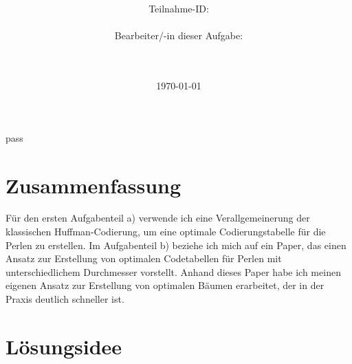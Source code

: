 pass\documentclass[a4paper,10pt,ngerman]{scrartcl}
\title{\textbf{\Huge\Aufgabe}}
\author{\LARGE Teilnahme-ID: \LARGE \TeilnahmeId \\\\
\LARGE Bearbeiter/-in dieser Aufgabe: \\
\LARGE \Name\\\\}
\date{\LARGE\today}
\begin{document}
    \maketitle
    \tableofcontents

    \section*{Zusammenfassung}
    Für den ersten Aufgabenteil a) verwende ich eine Verallgemeinerung der klassischen Huffman-Codierung, um eine optimale Codierungstabelle für die Perlen zu erstellen.
    Im Aufgabenteil b) beziehe ich mich auf ein Paper, das einen Ansatz zur Erstellung von optimalen Codetabellen für Perlen mit unterschiedlichem Durchmesser vorstellt.
    Anhand dieses Paper habe ich meinen eigenen Ansatz zur Erstellung von optimalen Bäumen erarbeitet, der in der Praxis deutlich schneller ist.

    \clearpage


    \section{Lösungsidee}
\end{document}

